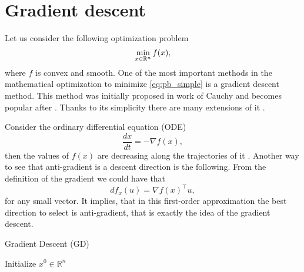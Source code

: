 \section{Gradient descent}\label{sec:basics_gd}
Let us consider the following optimization problem
\begin{equation}\label{eq:pb_simple}
    \min_{x\in\mathbb{R}^n}f(x),
\end{equation}
where $f$ is convex and smooth. One of the most important methods in the mathematical optimization to minimize \eqref{eq:pb_simple} is a gradient descent method. This method was initially proposed in work of Cauchy \cite[Extrait $383$]{cauchy1847methode} and becomes popular after \cite{polyak1963gradient}. Thanks to its simplicity there are many extensions of it \cite{polyak1969minimization, polyak1969conjugate, nesterov2005smooth, beck2009fast}.

Consider the ordinary differential equation (ODE)
$$
\frac{d x}{d t} = -\nabla f(x),
$$
then the values of $f(x)$ are decreasing along the trajectories of it \cite{cauchy1847methode}. Another way to see that anti-gradient is a descent direction is the following. From the definition of the gradient we could have that
$$
df_x(u) = \nabla f(x)^\top u,
$$
for any small vector. It implies, that in this first-order approximation the best direction to select is anti-gradient, that is exactly the idea of the gradient descent.

\begin{algorithm}
    \caption{Gradient Descent (GD)}
    \label{algo:gd}
    \begin{algorithmic}
        \STATE Initialize $x^0\in\mathbb{R}^n$
        \ENDFOR
    \end{algorithmic}
\end{algorithm}

